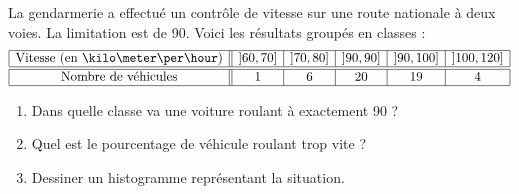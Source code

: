 
\begin{exercice}\label{exosmath-0533}

    La gendarmerie a effectué un contrôle de vitesse sur une route nationale à deux voies. La limitation est de \unit{90}{\kilo\meter\per\hour}. Voici les résultats groupés en classes :
    \begin{equation*}
        \begin{array}[]{|c||c|c|c|c|c|}
            \hline
            \text{Vitesse (en \kilo\meter\per\hour)}&\mathopen] 60 , 70 \mathclose]&\mathopen] 70 , 80 \mathclose]&\mathopen] 90 , 90 \mathclose]&\mathopen] 90 , 100 \mathclose]&\mathopen] 100 , 120 \mathclose]\\
              \hline\hline
              \text{Nombre de véhicules}&1&6&20&19&4\\ 
              \hline 
               \end{array}
    \end{equation*}
    \begin{enumerate}
        \item
            Dans quelle classe va une voiture roulant à exactement \unit{90}{\kilo\meter\per\hour} ?
        \item
            Quel est le pourcentage de véhicule roulant trop vite ?
        \item
            Dessiner un histogramme représentant la situation.
    \end{enumerate}

\end{exercice}
